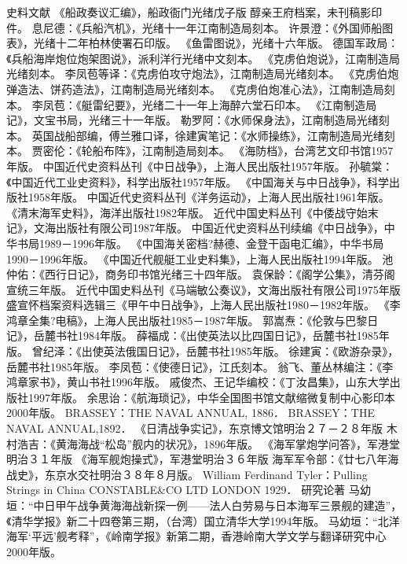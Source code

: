 \documentclass[12pt,UTF8]{ctexbook}
\begin{document}
史料文献
《船政奏议汇编》，船政衙门光绪戊子版
醇亲王府档案，未刊稿影印件。
息尼德：《兵船汽机》，光绪十一年江南制造局刻本。
许景澄：《外国师船图表》，光绪十二年柏林使署石印版。
《鱼雷图说》，光绪十六年版。
德国军政局：《兵船海岸炮位炮架图说》，派利洋行光绪中文刻本。
《克虏伯炮说》，江南制造局光绪刻本。
李凤苞等译：《克虏伯攻守炮法》，江南制造局光绪刻本。
《克虏伯炮弹造法、饼药造法》，江南制造局光绪刻本。
《克虏伯炮准心法》，江南制造局刻本。
李凤苞：《艇雷纪要》，光绪二十一年上海醉六堂石印本。
《江南制造局记》，文宝书局，光绪三十一年版。
勒罗阿：《水师保身法》，江南制造局光绪刻本。
英国战船部编，傅兰雅口译，徐建寅笔记：《水师操练》，江南制造局光绪刻本。
贾密伦：《轮船布阵》，江南制造局刻本。
《海防档》，台湾艺文印书馆1957年版。
中国近代史资料丛刊《中日战争》，上海人民出版社1957年版。
孙毓棠：《中国近代工业史资料》，科学出版社1957年版。
《中国海关与中日战争》，科学出版社1958年版。
中国近代史资料丛刊《洋务运动》，上海人民出版社1961年版。
《清末海军史料》，海洋出版社1982年版。
近代中国史料丛刊《中倭战守始末记》，文海出版社有限公司1987年版。
中国近代史资料丛刊续编《中日战争》，中华书局1989－1996年版。
《中国海关密档?赫德、金登干函电汇编》，中华书局1990－1996年版。
《中国近代舰艇工业史料集》，上海人民出版社1994年版。
池仲佑：《西行日记》，商务印书馆光绪三十四年版。
袁保龄：《阁学公集》，清芬阁宣统三年版。
近代中国史料丛刊《马端敏公奏议》，文海出版社有限公司1975年版
盛宣怀档案资料选辑三《甲午中日战争》，上海人民出版社1980－1982年版。
《李鸿章全集?电稿》，上海人民出版社1985－1987年版。
郭嵩焘：《伦敦与巴黎日记》，岳麓书社1984年版。
薛福成：《出使英法以比四国日记》，岳麓书社1985年版。
曾纪泽：《出使英法俄国日记》，岳麓书社1985年版。
徐建寅：《欧游杂录》，岳麓书社1985年版。
李凤苞：《使德日记》，江氏刻本。
翁飞、董丛林编注：《李鸿章家书》，黄山书社1996年版。
戚俊杰、王记华编校：《丁汝昌集》，山东大学出版社1997年版。
余思诒：《航海琐记》，中华全国图书馆文献缩微复制中心影印本2000年版。
BRASSEY：THE NAVAL ANNUAL, 1886．
BRASSEY：THE NAVAL ANNUAL,1892．
《日清战争实记》，东京博文馆明治２７－２８年版
木村浩吉：《黄海海战“松岛”舰内的状况》，1896年版。
《海军掌炮学问答》，军港堂明治３１年版
《海军舰炮操式》，军港堂明治３６年版
海军军令部：《廿七八年海战史》，东京水交社明治３８年８月版。
William Ferdinand Tyler：Pulling Strings in China CONSTABLE\&CO LTD LONDON 1929．
研究论著
马幼垣：“中日甲午战争黄海海战新探一例——法人白劳易与日本海军三景舰的建造”，《清华学报》新二十四卷第三期，（台湾）国立清华大学1994年版。
马幼垣：“北洋海军‘平远’舰考释”，《岭南学报》新第二期，香港岭南大学文学与翻译研究中心2000年版。
\end{document}
